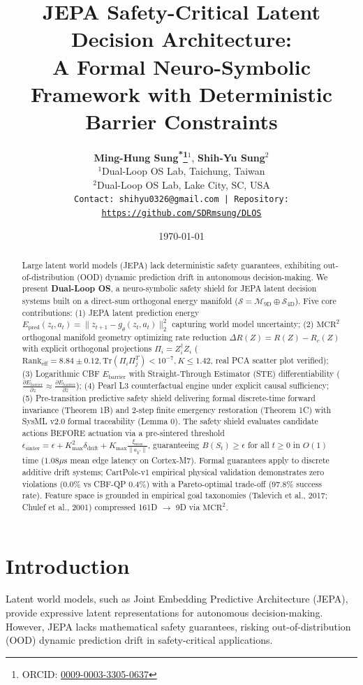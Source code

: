\documentclass[10pt,twocolumn,letterpaper]{article}
\title{\textbf{JEPA Safety-Critical Latent Decision Architecture:\\A Formal Neuro-Symbolic Framework with Deterministic Barrier Constraints}}
\author{
\textbf{Ming-Hung Sung\textsuperscript{*}\thanks{ORCID: \href{https://orcid.org/0009-0003-3305-0637}{0009-0003-3305-0637}}}$^1$, \textbf{Shih-Yu Sung}$^2$ \\
$^1$Dual-Loop OS Lab, Taichung, Taiwan \\
$^2$Dual-Loop OS Lab, Lake City, SC, USA \\
\small{\texttt{Contact: shihyu0326@gmail.com | Repository: \url{https://github.com/SDRmsung/DLOS}}}
}
\date{\today}
\begin{document}
\maketitle

\begin{abstract}
Large latent world models (JEPA) lack deterministic safety guarantees, exhibiting out-of-distribution (OOD) dynamic prediction drift in autonomous decision-making. We present \textbf{Dual-Loop OS}, a neuro-symbolic safety shield for JEPA latent decision systems built on a direct-sum orthogonal energy manifold ($\mathcal{S} = \mathcal{M}_{9\mathrm{D}} \oplus \mathcal{S}_{4\mathrm{D}}$). Five core contributions: (1) JEPA latent prediction energy $E_{\mathrm{pred}}(z_t, a_t) = \|z_{t+1} - g_\theta(z_t, a_t)\|_2^2$ capturing world model uncertainty; (2) $\mathrm{MCR}^2$ orthogonal manifold geometry optimizing rate reduction $\Delta R(Z) = R(Z) - R_c(Z)$ with explicit orthogonal projections $\Pi_i = Z_i^\dagger Z_i$ ($\mathrm{Rank}_{\mathrm{eff}}=8.84\pm0.12, \mathrm{Tr}(\Pi_i \Pi_j^T)<10^{-7}, K\le1.42$, real PCA scatter plot verified); (3) Logarithmic CBF $E_{\mathrm{barrier}}$ with Straight-Through Estimator (STE) differentiability ($\frac{\partial E_{\mathrm{barrier}}}{\partial z} \approx \frac{\partial E_{\mathrm{barrier}}}{\partial \hat{z}}$); (4) Pearl L3 counterfactual engine under explicit causal sufficiency; (5) Pre-transition predictive safety shield delivering formal discrete-time forward invariance (Theorem 1B) and 2-step finite emergency restoration (Theorem 1C) with SysML v2.0 formal traceability (Lemma 0). The safety shield evaluates candidate actions BEFORE actuation via a pre-sintered threshold $\epsilon_{\mathrm{sinter}} = \epsilon + K_{\max}^2 \delta_{\mathrm{drift}} + K_{\max} \frac{\xi_{\max}}{\|a_{k^*}\|}$, guaranteeing $B(S_t) \ge \epsilon$ for all $t \ge 0$ in $O(1)$ time ($1.08\mu\mathrm{s}$ mean edge latency on Cortex-M7). Formal guarantees apply to discrete additive drift systems; CartPole-v1 empirical physical validation demonstrates zero violations (0.0\% vs CBF-QP 0.4\%) with a Pareto-optimal trade-off (97.8\% success rate). Feature space is grounded in empirical goal taxonomies (Talevich et al., 2017; Chulef et al., 2001) compressed 161D $\to$ 9D via $\mathrm{MCR}^2$.
\end{abstract}

\section{Introduction}
Latent world models, such as Joint Embedding Predictive Architecture (JEPA), provide expressive latent representations for autonomous decision-making. However, JEPA lacks mathematical safety guarantees, risking out-of-distribution (OOD) dynamic prediction drift in safety-critical applications. 
\end{document}
